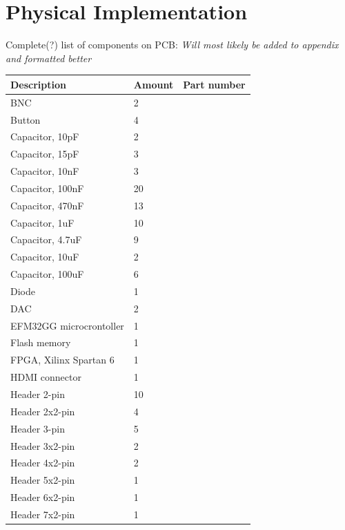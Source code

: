 \chapter{Physical Implementation}

\begin{table}[H]
    Complete(?) list of components on PCB: \textit{Will most likely be added to appendix and formatted better}
    \newline
    \begin{tabular}{| p{3cm} | p{3cm} | p{3cm} |}
        \hline
        \textbf{Description} & \textbf{Amount} & \textbf{Part number} \\ [0.5ex] 
        \hline\hline
        BNC & 2 &\\ \hline
        Button & 4 &\\ \hline
        Capacitor, 10pF & 2 &\\ \hline
        Capacitor, 15pF & 3 &\\ \hline
        Capacitor, 10nF & 3 &\\ \hline
        Capacitor, 100nF & 20 &\\ \hline
        Capacitor, 470nF & 13 &\\ \hline
        Capacitor, 1uF & 10 &\\ \hline
        Capacitor, 4.7uF & 9 &\\ \hline
        Capacitor, 10uF & 2 &\\ \hline
        Capacitor, 100uF & 6 &\\ \hline
        Diode & 1 &\\ \hline
        DAC & 2 &\\ \hline
        EFM32GG microcrontoller & 1 &\\ \hline
        Flash memory & 1 &\\ \hline
        FPGA, Xilinx Spartan 6 & 1 &\\ \hline
        HDMI connector & 1 &\\ \hline
        Header 2-pin & 10 &\\ \hline
        Header 2x2-pin & 4 &\\ \hline
        Header 3-pin & 5 &\\ \hline
        Header 3x2-pin & 2 &\\ \hline
        Header 4x2-pin & 2 &\\ \hline
        Header 5x2-pin & 1 &\\ \hline
        Header 6x2-pin & 1 &\\ \hline
        Header 7x2-pin & 1 &\\ \hline

\end{tabular}
\end{table}
